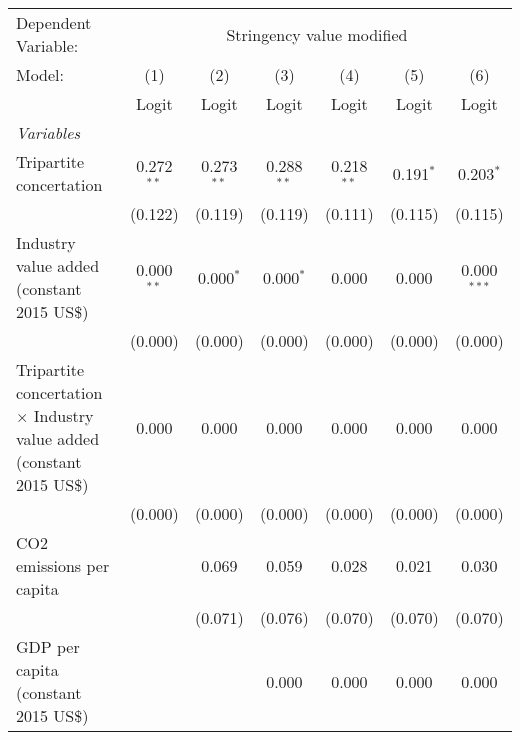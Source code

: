 
\begingroup
\centering
\begin{tabular}{lcccccc}
   \toprule
   Dependent Variable: & \multicolumn{6}{c}{Stringency value modified}\\
   Model:                                                                       & (1)          & (2)          & (3)          & (4)            & (5)            & (6)\\  
                                                                                &  Logit       & Logit        & Logit        & Logit          & Logit          & Logit\\  
   \midrule
   \emph{Variables}\\
   Tripartite concertation                                                      & 0.272$^{**}$ & 0.273$^{**}$ & 0.288$^{**}$ & 0.218$^{**}$   & 0.191$^{*}$    & 0.203$^{*}$\\   
                                                                                & (0.122)      & (0.119)      & (0.119)      & (0.111)        & (0.115)        & (0.115)\\   
   Industry value added (constant 2015 US\$)                                    & 0.000$^{**}$ & 0.000$^{*}$  & 0.000$^{*}$  & 0.000          & 0.000          & 0.000$^{***}$\\   
                                                                                & (0.000)      & (0.000)      & (0.000)      & (0.000)        & (0.000)        & (0.000)\\   
   Tripartite concertation $\times$ Industry value added (constant 2015 US\$)   & 0.000        & 0.000        & 0.000        & 0.000          & 0.000          & 0.000\\   
                                                                                & (0.000)      & (0.000)      & (0.000)      & (0.000)        & (0.000)        & (0.000)\\   
   CO2 emissions per capita                                                     &              & 0.069        & 0.059        & 0.028          & 0.021          & 0.030\\   
                                                                                &              & (0.071)      & (0.076)      & (0.070)        & (0.070)        & (0.070)\\   
   GDP per capita (constant 2015 US\$)                                          &              &              & 0.000        & 0.000          & 0.000          & 0.000\\   

\end{tabular}
